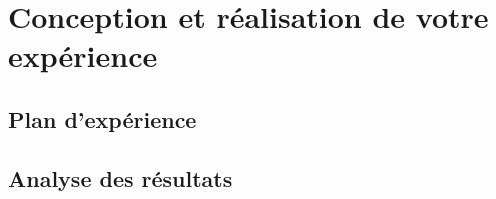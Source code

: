 
\section{Conception et réalisation de votre expérience}

\subsection{Plan d'expérience}


\subsection{Analyse des résultats}
